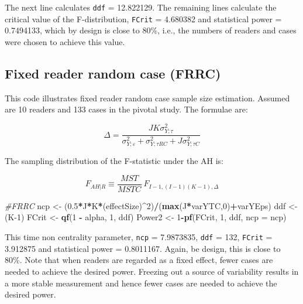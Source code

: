 \documentclass[]{book}
\newenvironment{Shaded}{\begin{snugshade}}{\end{snugshade}}
\newcommand{\CommentTok}[1]{\textcolor[rgb]{0.56,0.35,0.01}{\textit{#1}}}
\newcommand{\DataTypeTok}[1]{\textcolor[rgb]{0.13,0.29,0.53}{#1}}
\newcommand{\DecValTok}[1]{\textcolor[rgb]{0.00,0.00,0.81}{#1}}
\newcommand{\FloatTok}[1]{\textcolor[rgb]{0.00,0.00,0.81}{#1}}
\newcommand{\KeywordTok}[1]{\textcolor[rgb]{0.13,0.29,0.53}{\textbf{#1}}}
\newcommand{\NormalTok}[1]{#1}
\newcommand{\OperatorTok}[1]{\textcolor[rgb]{0.81,0.36,0.00}{\textbf{#1}}}
\newcommand{\StringTok}[1]{\textcolor[rgb]{0.31,0.60,0.02}{#1}}
\begin{document}
The next line calculates \texttt{ddf} = 12.822129. The remaining lines calculate the critical value of the F-distribution, \texttt{FCrit} = 4.680382 and statistical power = 0.7494133, which by design is close to 80\%, i.e., the numbers of readers and cases were chosen to achieve this value.

\hypertarget{fixed-reader-random-case-frrc}{%
\subsection{Fixed reader random case (FRRC)}\label{fixed-reader-random-case-frrc}}

This code illustrates fixed reader random case sample size estimation. Assumed are 10 readers and 133 cases in the pivotal study. The formulae are:

\[\Delta =\frac{JK\sigma _{Y;\tau }^{2}}{\sigma _{Y;\varepsilon }^{2}+\sigma _{Y;\tau RC}^{2}+J\sigma _{Y;\tau C}^{2}}\]

The sampling distribution of the F-statistic under the AH is:

\[{{F}_{\left. AH \right|R}}\equiv \frac{MST}{MSTC}\tilde{\ }{{F}_{I-1,\left( I-1 \right)\left( K-1 \right),\Delta }}\]

\begin{Shaded}
\begin{Highlighting}[]
\CommentTok{#FRRC}
\NormalTok{ncp <-}\StringTok{ }\NormalTok{(}\FloatTok{0.5}\OperatorTok{*}\NormalTok{J}\OperatorTok{*}\NormalTok{K}\OperatorTok{*}\NormalTok{(effectSize)}\OperatorTok{^}\DecValTok{2}\NormalTok{)}\OperatorTok{/}\NormalTok{(}\KeywordTok{max}\NormalTok{(J}\OperatorTok{*}\NormalTok{varYTC,}\DecValTok{0}\NormalTok{)}\OperatorTok{+}\NormalTok{varYEps)}
\NormalTok{ddf <-}\StringTok{ }\NormalTok{(K}\DecValTok{-1}\NormalTok{)}
\NormalTok{FCrit <-}\StringTok{ }\KeywordTok{qf}\NormalTok{(}\DecValTok{1} \OperatorTok{-}\StringTok{ }\NormalTok{alpha, }\DecValTok{1}\NormalTok{, ddf)}
\NormalTok{Power2 <-}\StringTok{ }\DecValTok{1}\OperatorTok{-}\KeywordTok{pf}\NormalTok{(FCrit, }\DecValTok{1}\NormalTok{, ddf, }\DataTypeTok{ncp =}\NormalTok{ ncp)}
\end{Highlighting}
\end{Shaded}

This time non centrality parameter, \texttt{ncp} = 7.9873835, \texttt{ddf} = 132, \texttt{FCrit} = 3.912875 and statistical power = 0.8011167. Again, be design, this is close to 80\%. Note that when readers are regarded as a fixed effect, fewer cases are needed to achieve the desired power. Freezing out a source of variability results in a more stable measurement and hence fewer cases are needed to achieve the desired power.
\end{document}
